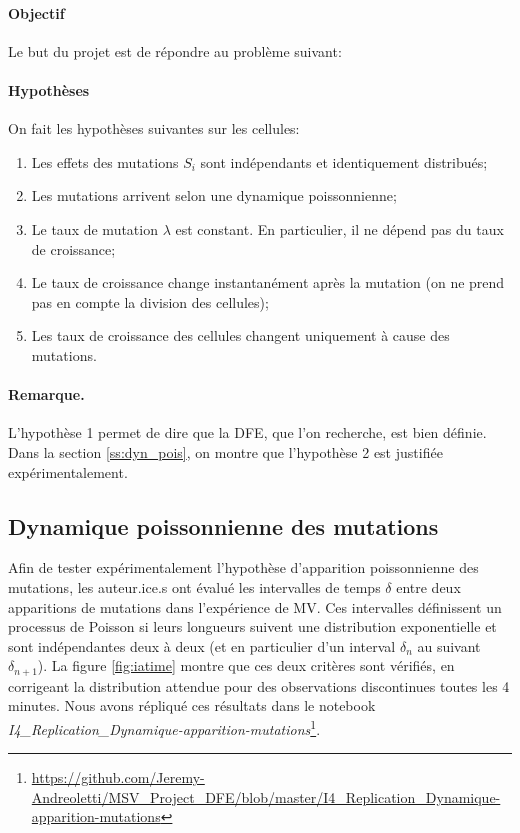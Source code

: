 \documentclass[12pt]{article}
\newcommand{\req}[1]{\paragraph{Remarque.}#1\vspace{0.1cm}}
\begin{document}
\paragraph{Objectif} Le but du projet est de répondre au problème suivant:
\vspace{5mm}



\paragraph{Hypothèses}
On fait les hypothèses suivantes sur les cellules:
\begin{enumerate}
\item Les effets des mutations $S_i$ sont indépendants et identiquement distribués;
\item Les mutations arrivent selon une dynamique poissonnienne;
\item Le taux de mutation $\lambda$ est constant. En particulier, il ne dépend pas du taux de croissance;
\item Le taux de croissance change instantanément après la mutation (on ne prend pas en compte la division des cellules);
\item Les taux de croissance des cellules changent uniquement à cause des mutations.
\end{enumerate}

\req{L'hypothèse 1 permet de dire que la DFE, que l'on recherche, est bien définie. Dans la section \ref{ss:dyn_pois}, on montre que l'hypothèse 2 est justifiée expérimentalement.}

\subsection{Dynamique poissonnienne des mutations\label{ss:dyn_pois}}

Afin de tester expérimentalement l'hypothèse d'apparition poissonnienne des mutations, les auteur.ice.s ont évalué les intervalles de temps $\delta$ entre deux apparitions de mutations dans l'expérience de MV. Ces intervalles définissent un processus de Poisson si leurs longueurs suivent une distribution exponentielle et sont indépendantes deux à deux (et en particulier d'un interval $\delta_n$ au suivant $\delta_{n+1}$). La figure \ref{fig:iatime} montre que ces deux critères sont vérifiés, en corrigeant la distribution attendue pour des observations discontinues toutes les 4 minutes. Nous avons répliqué ces résultats dans le notebook \emph{I4\_Replication\_Dynamique-apparition-mutations}\footnote{\url{https://github.com/Jeremy-Andreoletti/MSV_Project_DFE/blob/master/I4_Replication_Dynamique-apparition-mutations}}.
\end{document}
